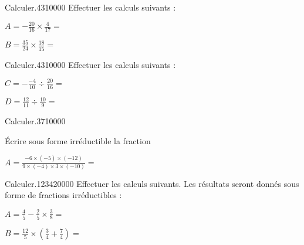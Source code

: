 
\begin{pageParcoursu} %




\begin{minipage}{0.5\linewidth}
\begin{ExoCuN}{Calculer.}{43}{1}{0}{0}{0}{0}
Effectuer les calculs suivants : \vspace{0.4cm}

$A=-\frac{20}{16} \times \frac{4}{17}=$

$B=\frac{35}{24} \times \frac{18}{15}=$
\end{ExoCuN}
\end{minipage}
\begin{minipage}{0.5\linewidth}
\begin{ExoCuN}{Calculer.}{43}{1}{0}{0}{0}{0}
Effectuer les calculs suivants : \vspace{0.4cm}

$C=-\frac{-4}{10} \div \frac{20}{16}=$

$D=\frac{12}{11} \div \frac{10}{9}=$


\end{ExoCuN}
\end{minipage}


\begin{ExoCuN}{Calculer.}{37}{1}{0}{0}{0}{0}

Écrire sous forme irréductible la fraction 

$A=\frac{-6 \times ( -5) \times (-12)}{9 \times ( -4) \times 3 \times (-10)}=$

\end{ExoCuN}



\begin{ExoCu}{Calculer.}{1234}{2}{0}{0}{0}{0}
Effectuer les calculs suivants. Les résultats seront donnés sous forme de fractions irréductibles : \vspace{0.4cm}

$A=\frac{4}{5} - \frac{2}{5} \times \frac{3}{8}=$ 

$B = \frac{12}{5} \times \left(\frac{3}{4} + \frac{7}{4} \right)=$ 


\end{ExoCu}
\end{pageParcoursu}
